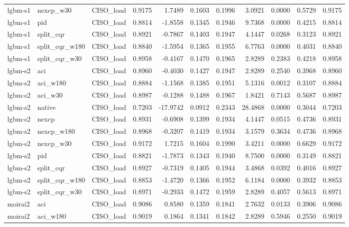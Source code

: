 \begin{tabular}{lllrrrrrrrr}
lgbm-s1 & nexcp_w30 & CISO_load & 0.9175 & 1.7489 & 0.1603 & 0.1996 & 3.0921 & 0.0000 & 0.5729 & 0.9175 \\
lgbm-s1 & pid & CISO_load & 0.8814 & -1.8558 & 0.1345 & 0.1946 & 9.7368 & 0.0000 & 0.4215 & 0.8814 \\
lgbm-s1 & split_cqr & CISO_load & 0.8921 & -0.7867 & 0.1403 & 0.1947 & 4.1447 & 0.0268 & 0.3123 & 0.8921 \\
lgbm-s1 & split_cqr_w180 & CISO_load & 0.8840 & -1.5954 & 0.1365 & 0.1955 & 6.7763 & 0.0000 & 0.4031 & 0.8840 \\
lgbm-s1 & split_cqr_w30 & CISO_load & 0.8958 & -0.4167 & 0.1470 & 0.1965 & 2.8289 & 0.2383 & 0.4218 & 0.8958 \\
lgbm-s2 & aci & CISO_load & 0.8960 & -0.4030 & 0.1427 & 0.1947 & 2.8289 & 0.2540 & 0.3968 & 0.8960 \\
lgbm-s2 & aci_w180 & CISO_load & 0.8884 & -1.1568 & 0.1385 & 0.1951 & 5.1316 & 0.0012 & 0.3107 & 0.8884 \\
lgbm-s2 & aci_w30 & CISO_load & 0.8987 & -0.1288 & 0.1488 & 0.1967 & 1.8421 & 0.7143 & 0.5687 & 0.8987 \\
lgbm-s2 & native & CISO_load & 0.7203 & -17.9742 & 0.0912 & 0.2343 & 28.4868 & 0.0000 & 0.3044 & 0.7203 \\
lgbm-s2 & nexcp & CISO_load & 0.8931 & -0.6908 & 0.1399 & 0.1934 & 4.1447 & 0.0515 & 0.4736 & 0.8931 \\
lgbm-s2 & nexcp_w180 & CISO_load & 0.8968 & -0.3207 & 0.1419 & 0.1934 & 3.1579 & 0.3634 & 0.4736 & 0.8968 \\
lgbm-s2 & nexcp_w30 & CISO_load & 0.9172 & 1.7215 & 0.1604 & 0.1990 & 3.4211 & 0.0000 & 0.6629 & 0.9172 \\
lgbm-s2 & pid & CISO_load & 0.8821 & -1.7873 & 0.1343 & 0.1940 & 8.7500 & 0.0000 & 0.3149 & 0.8821 \\
lgbm-s2 & split_cqr & CISO_load & 0.8927 & -0.7319 & 0.1405 & 0.1944 & 3.4868 & 0.0392 & 0.4016 & 0.8927 \\
lgbm-s2 & split_cqr_w180 & CISO_load & 0.8853 & -1.4720 & 0.1366 & 0.1952 & 6.1184 & 0.0000 & 0.3932 & 0.8853 \\
lgbm-s2 & split_cqr_w30 & CISO_load & 0.8971 & -0.2933 & 0.1472 & 0.1959 & 2.8289 & 0.4057 & 0.5613 & 0.8971 \\
moirai2 & aci & CISO_load & 0.9086 & 0.8580 & 0.1359 & 0.1841 & 2.7632 & 0.0133 & 0.3906 & 0.9086 \\
moirai2 & aci_w180 & CISO_load & 0.9019 & 0.1864 & 0.1341 & 0.1842 & 2.8289 & 0.5946 & 0.2550 & 0.9019 \\

\end{tabular}
